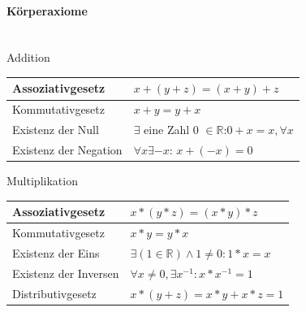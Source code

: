 \paragraph{Körperaxiome}\mbox{}\\
\noindent
Addition\linebreak
\begin{tabularx}{\columnwidth}{@{}X|X@{}}
    \hline
    Assoziativgesetz      & $x+(y+z) = (x+y)+z$                                                  \\ \hline
    Kommutativgesetz      & $x+y = y+x$                                                          \\ \hline
    Existenz der Null     & $\exists$ eine Zahl 0 $\in \mathbb{R}$:\linebreak $0+x=x, \forall x$ \\ \hline
    Existenz der Negation & $\forall x\exists -x$: $x+(-x) = 0$                                  \\ \hline
\end{tabularx}
\vspace{1mm}
\noindent
Multiplikation\linebreak
\begin{tabularx}{\columnwidth}{@{}X|X@{}}
    \hline
    Assoziativgesetz      & $x*(y*z) = (x*y)*z$                               \\ \hline
    Kommutativgesetz      & $x*y = y*x$                                       \\ \hline
    Existenz der Eins     & $\exists (1\in \mathbb{R}) \land 1 \neq 0: 1*x=x$ \\ \hline
    Existenz der Inversen & $\forall x \neq 0, \exists x^{-1}: x*x^{-1}=1$    \\ \hline
    Distributivgesetz     & $x*(y+z) = x*y + x*z = 1$                         \\ \hline
\end{tabularx}
\vspace{1mm}

